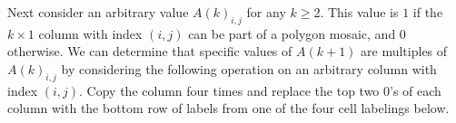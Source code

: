 \documentclass[12pt]{article}
\theoremstyle{plain}
\theoremstyle{definition}
\theoremstyle{remark}
\theoremstyle{definition}
\newcommand{\cell}[4]{ \draw[thick] ( #1 , #2 ) rectangle ( #3 , #4 );}
\newcommand{\lablnode}[3]{\node[shape=circle,draw=none,fill=none, inner sep=0pt,minimum size=0pt] (A) at ( #1 , #2 ) {#3};}
\newcommand{\lablvertex}[3]{\node[shape=circle,draw=none,fill=white, inner sep=2pt,minimum size=5pt] (A) at ( #1 , #2 ) {#3};}
\begin{document}
\begin{center}
\end{center}

Next consider an arbitrary value $A(k)_{i,j}$ for any $k \geq 2$. This value is $1$ if the $k \times 1$ column with index $(i,j)$ can be part of a polygon mosaic, and $0$ otherwise. We can determine that specific values of $A(k+1)$ are multiples of $A(k)_{i,j}$ by considering the following operation on an arbitrary column with index $(i,j)$. Copy the column four times and replace the top two $0$'s of each column with the bottom row of labels from one of the four cell labelings below. 
\end{document}
